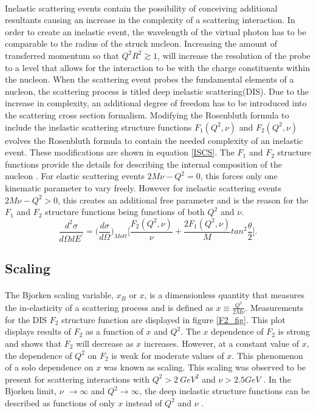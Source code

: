 \paragraph{}Inelastic scattering events contain the possibility of conceiving additional resultants causing an increase in the complexity of a scattering interaction. In order to create an inelastic event, the wavelength of the virtual photon has to be comparable to the radius of the struck nucleon. Increasing the amount of transferred momentum so that $Q^2R^2 \gtrsim 1$, will increase the resolution of the probe to a level that allows for the interaction to be with the charge constituents within the nucleon. When the scattering event probes the fundamental elements of a nucleon, the scattering process is titled deep inelastic scattering(DIS). Due to the increase in complexity, an additional degree of freedom has to be introduced into the scattering cross section formalism. Modifying the Rosenbluth formula to include the inelastic scattering structure functions $F_1(Q^2,\nu)$ and $F_2(Q^2,\nu)$ evolves the Rosenbluth formula to contain the needed complexity of an inelastic event. These modifications are shown in equation \ref{ISCS}. The $F_1$ and $F_2$ structure functions provide the details for describing the internal composition of the nucleon \cite{PnN}. For elastic scattering events $2M\nu - Q^2 = 0$, this forces only one kinematic parameter to vary freely. However for inelastic scattering events $2M\nu - Q^2 > 0$, this creates an additional free parameter and is the reason for the  $F_1$ and $F_2$ structure functions being functions of both $Q^2$ and $\nu$.
\begin{equation}
\label{ISCS}
\frac{d^2\sigma}{d\Omega dE^\prime}=\bigg(\frac{d\sigma}{d\Omega}\bigg)_{Mott} \bigg\lbrack \frac{F_2(Q^2,\nu)}{\nu} + \frac{2F_1(Q^2,\nu)}{M}tan^2\frac{\theta}{2} \bigg \rbrack.
\end{equation}  

\subsection{Scaling}
\paragraph{}The Bjorken scaling variable, $x_B$ or $x$, is a dimensionless quantity that measures the in-elasticity of a scattering process and is defined as $x \equiv \frac{Q^2}{2M\nu}$. Measurements for the DIS $F_2$ structure function are displayed in figure \ref{F2_fig}. This plot displays results of $F_2$ as a function of $x$ and $Q^2$. The $x$ dependence of $F_2$ is strong and shows that $F_2$ will decrease as $x$ increases. However, at a constant value of $x$, the dependence of $Q^2$ on $F_2$ is weak for moderate values of $x$. This phenomenon of a solo dependence on $x$ was known as scaling. This scaling was observed to be present for scattering interactions with $Q^2 > 2 \: GeV^2$  and $\nu > 2.5 GeV$ \cite{Atwood}. In the Bjorken limit, $\nu$ $\rightarrow \infty$ and $Q^2 \rightarrow \infty$, the deep inelastic structure functions can be described as functions of only $x$ instead of $Q^2$ and $\nu$ \cite{Briskin_thesis}.

